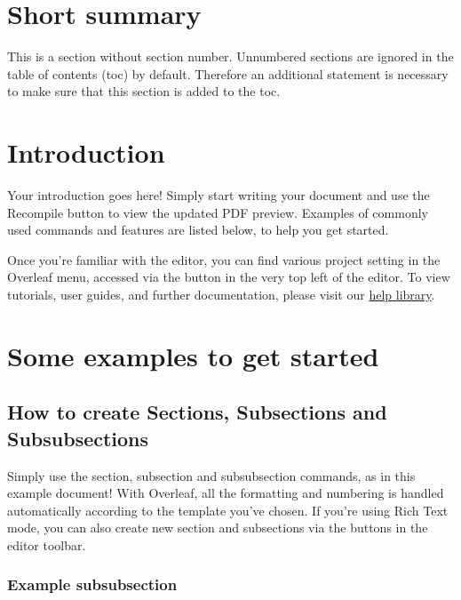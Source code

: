 \section*{Short summary}

This is a section without section number. Unnumbered sections are ignored in the table of contents (toc) by default. Therefore an additional statement is necessary to make sure that this section is added to the toc.


\section{Introduction}

Your introduction goes here! Simply start writing your document and use the Recompile button to view the updated PDF preview. Examples of commonly used commands and features are listed below, to help you get started.

Once you're familiar with the editor, you can find various project setting in the Overleaf menu, accessed via the button in the very top left of the editor. To view tutorials, user guides, and further documentation, please visit our \href{https://www.overleaf.com/learn}{help library}.


\section{Some examples to get started}

\subsection{How to create Sections, Subsections and Subsubsections}

Simply use the section, subsection and subsubsection commands, as in this example document! With Overleaf, all the formatting and numbering is handled automatically according to the template you've chosen. If you're using Rich Text mode, you can also create new section and subsections via the buttons in the editor toolbar.

\subsubsection{Example subsubsection}

